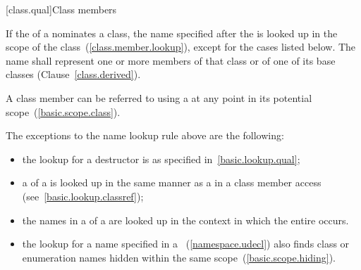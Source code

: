 [class.qual]{Class members}

\pnum
{}%
If the  of a 
nominates a class, the name specified after the
 is looked up in the scope of the
class~(\ref{class.member.lookup}), except for the cases listed below.
The name shall represent one or more members of that class or of one of
its base classes (Clause~\ref{class.derived}). \begin{note} A class member
can be referred to using a  at any point in its
potential scope~(\ref{basic.scope.class}). \end{note} The exceptions to
the name lookup rule above are the following:
\begin{itemize}
\item the lookup for a destructor is as specified
in~\ref{basic.lookup.qual};

\item a  of a
 is looked up
in the same manner as a  in a class member
access (see~\ref{basic.lookup.classref});

\item the names in a  of a
 are looked up in the context in which the entire
 occurs.

\item the lookup for a name specified in a
~(\ref{namespace.udecl}) also finds class or
enumeration names hidden within the same
scope~(\ref{basic.scope.hiding}).
\end{itemize}

